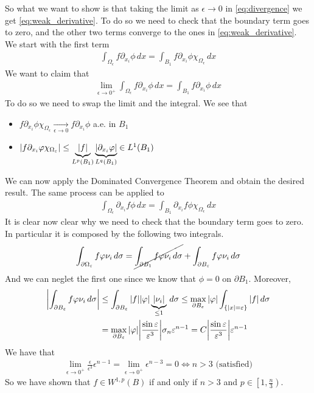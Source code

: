 So what we want to show is that taking the limit as \(\epsilon \to 0\) in \eqref{eq:divergence} we get \eqref{eq:weak_derivative}. 
To do so we need to check that the boundary term goes to zero, and the other two terms converge to the ones in \eqref{eq:weak_derivative}. \\
We start with the first term
\[ 
    \begin{split}
        \int_{\Omega_\epsilon} f \partial_{x_i} \phi \, dx = \int_{B_1} f \partial_{x_i} \phi \chi_{\Omega_\epsilon} \, dx
    \end{split}
\]
We want to claim that 
\[
    \begin{split}
        \lim_{\epsilon \to 0^+} \int_{\Omega_\epsilon} f \partial_{x_i} \phi \, dx = \int_{B_1} f \partial_{x_i} \phi \, dx
    \end{split}
\]
To do so we need to swap the limit and the integral. We see that 
\begin{itemize}
    \item \(f \partial_{x_i} \phi \chi_{\Omega_\epsilon} \underset{\epsilon \to 0}{\longrightarrow} f \partial_{x_i} \phi\) a.e. in \(B_1\)
    \item \(\abs{f \partial_{x_i} \phi \chi_{\Omega_\epsilon}} \leq \underbrace{\abs{f}}_{L^p(B_1)} \underbrace{\abs{\partial_{x_i} \phi}}_{L^q(B_1)} \in L^1(B_1)\)
\end{itemize}
We can now apply the Dominated Convergence Theorem and obtain the desired result. 
The same process can be applied to
\[
    \begin{split}
        \int_{\Omega_\epsilon} \partial_{x_i} f \phi \, dx = \int_{B_1} \partial_{x_i} f \phi \chi_{\Omega_\epsilon} \, dx
    \end{split}
\]
It is clear now clear why we need to check that the boundary term goes to zero. In particular it is composed by the following two integrals.
\[
    \begin{split}
        \int_{\partial\Omega_\epsilon} f \phi \nu_i \, d\sigma = \cancel{\int_{\partial B_1} f \phi \nu_i \, d\sigma} + \int_{\partial B_\epsilon} f \phi \nu_i \, d\sigma    
    \end{split}
\]
And we can neglet the first one since we know that $\phi = 0$ on $\partial B_1$.
Moreover,
\[
    \begin{split}
        \abs{\int_{\partial B_\epsilon} f \phi \nu_i \, d\sigma} & \leq \int_{\partial B_\epsilon} \abs{f} \abs{\phi} \underbrace{\abs{\nu_i}}_{\leq 1} \, d\sigma \leq \max_{\partial B_\epsilon} \abs{\phi} \int_{\{ \abs{x} = \epsilon \}} \abs{f} \, d\sigma \\
                                                                 & = \max_{\partial B_\epsilon} \abs{\phi} \abs{\frac{\sin\epsilon}{\epsilon^3}} \sigma_n \epsilon^{n-1} = C \abs{\frac{\sin\epsilon}{\epsilon^3}} \epsilon^{n-1}
    \end{split}
\]
We have that 
\[
    \begin{split}
        \lim_{\epsilon \to 0^+} \frac{\epsilon}{\epsilon^3} \epsilon^{n-1} = \lim_{\epsilon \to 0^+} \epsilon^{n-3} = 0 \iff n > 3 \text{ (satisfied)}
    \end{split}
\]
So we have shown that $f \in W^{1, p}(B)$ if and only if $n>3$ and $p \in \left[1, \frac{n}{3}\right)$.

